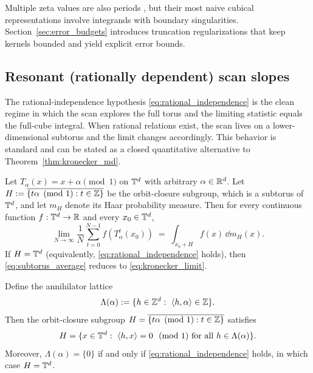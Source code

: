 Multiple zeta values are also periods \cite{KontsevichZagier2001,Brown2012}, but their most naive cubical representations involve integrands with boundary singularities. Section~\ref{sec:error_budgets} introduces truncation regularizations that keep kernels bounded and yield explicit error bounds.

\subsection{Resonant (rationally dependent) scan slopes}
\label{sec:resonance_case}

The rational-independence hypothesis \eqref{eq:rational_independence} is the clean regime in which the scan explores the full torus and the limiting statistic equals the full-cube integral. When rational relations exist, the scan lives on a lower-dimensional subtorus and the limit changes accordingly. This behavior is standard and can be stated as a closed quantitative alternative to Theorem~\ref{thm:kronecker_md}.

\begin{theorem}
\label{thm:subtorus_reduction}
Let $T_\alpha(x)=x+\alpha\pmod{1}$ on $\mathbb{T}^d$ with arbitrary $\alpha\in\mathbb{R}^d$. Let $H:=\overline{\{t\alpha\pmod{1}:t\in\mathbb{Z}\}}$ be the orbit-closure subgroup, which is a subtorus of $\mathbb{T}^d$, and let $m_H$ denote its Haar probability measure. Then for every continuous function $f:\mathbb{T}^d\to\mathbb{R}$ and every $x_0\in\mathbb{T}^d$,
\begin{equation}
\label{eq:subtorus_average}
\lim_{N\to\infty}\frac{1}{N}\sum_{t=0}^{N-1} f(T_\alpha^t(x_0))
\;=\;\int_{x_0+H} f(x)\,\dd m_H(x).
\end{equation}
If $H=\mathbb{T}^d$ (equivalently, \eqref{eq:rational_independence} holds), then \eqref{eq:subtorus_average} reduces to \eqref{eq:kronecker_limit}.
\end{theorem}

\begin{lemma}
\label{lem:orbit_closure_annihilator}
Define the annihilator lattice
\[
\Lambda(\alpha):=\{h\in\ZZ^d:\ \langle h,\alpha\rangle\in\ZZ\}.
\]
Then the orbit-closure subgroup $H=\overline{\{t\alpha\pmod{1}:t\in\mathbb{Z}\}}$ satisfies
\[
H=\{x\in\mathbb{T}^d:\ \langle h,x\rangle=0\ \ (\mathrm{mod}\ 1)\ \text{for all }h\in\Lambda(\alpha)\}.
\]
Moreover, $\Lambda(\alpha)=\{0\}$ if and only if \eqref{eq:rational_independence} holds, in which case $H=\mathbb{T}^d$.
\end{lemma}

